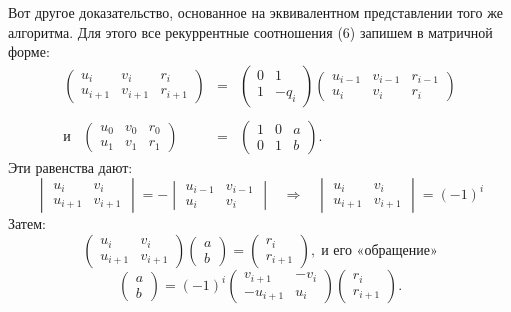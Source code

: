 Вот другое доказательство, основанное на эквивалентном предста­влении того же алгоритма. Для этого все рекуррентные соотноше­ния (6) запишем в матричной форме:
$$\begin{array}{rcl}
\begin{pmatrix}
u_{i} & v_{i} & r_{i}\\
u_{i+1} & v_{i+1} & r_{i+1}
\end{pmatrix}&=&
\begin{pmatrix}
0 & 1\\
1 & -q_{i}
\end{pmatrix}
\begin{pmatrix}
u_{i-1} & v_{i-1} & r_{i-1}\\
u_{i} & v_{i} & r_{i}
\end{pmatrix}\\
\;\\
\text{и}\;\;\;
\begin{pmatrix}
u_{0} & v_{0} & r_{0}\\
u_{1} & v_{1} & r_{1}
\end{pmatrix}&=&
\begin{pmatrix}
1 & 0 & a\\
0 & 1 & b
\end{pmatrix}.
\end{array}$$
Эти равенства дают:
$$\begin{vmatrix}
u_{i} & v_{i}\\
u_{i+1} & v_{i+1}
\end{vmatrix} =-
\begin{vmatrix}
u_{i-1} & v_{i-1}\\
u_{i} & v_{i}
\end{vmatrix}\;\;\;\Rightarrow\;\;\;
\begin{vmatrix}
u_{i} & v_{i}\\
u_{i+1} & v_{i+1}
\end{vmatrix}=(-1)^i$$
Затем:
$$\begin{pmatrix}
u_{i} & v_{i}\\
u_{i+1} & v_{i+1}
\end{pmatrix}
\begin{pmatrix}
a\\
b
\end{pmatrix}=
\begin{pmatrix}
r_{i}\\
r_{i+1}
\end{pmatrix},\;\text{и его «обращение»}$$
\newpage
$$\begin{pmatrix}
a\\
b
\end{pmatrix}
=(-1)^i
\begin{pmatrix}
v_{i+1} & -v_{i}\\
-u_{i+1} & u_{i}
\end{pmatrix}
\begin{pmatrix}
r_{i}\\
r_{i+1}
\end{pmatrix}.$$
